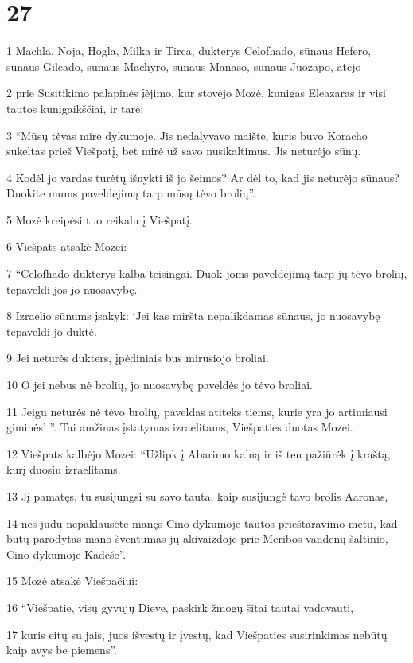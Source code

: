 \chapter{27}

\par 1 Machla, Noja, Hogla, Milka ir Tirca, dukterys Celofhado, sūnaus Hefero, sūnaus Gileado, sūnaus Machyro, sūnaus Manaso, sūnaus Juozapo, atėjo 
\par 2 prie Susitikimo palapinės įėjimo, kur stovėjo Mozė, kunigas Eleazaras ir visi tautos kunigaikščiai, ir tarė: 
\par 3 “Mūsų tėvas mirė dykumoje. Jis nedalyvavo maište, kuris buvo Koracho sukeltas prieš Viešpatį, bet mirė už savo nusikaltimus. Jis neturėjo sūnų. 
\par 4 Kodėl jo vardas turėtų išnykti iš jo šeimos? Ar dėl to, kad jis neturėjo sūnaus? Duokite mums paveldėjimą tarp mūsų tėvo brolių”. 
\par 5 Mozė kreipėsi tuo reikalu į Viešpatį. 
\par 6 Viešpats atsakė Mozei: 
\par 7 “Celofhado dukterys kalba teisingai. Duok joms paveldėjimą tarp jų tėvo brolių, tepaveldi jos jo nuosavybę. 
\par 8 Izraelio sūnums įsakyk: ‘Jei kas miršta nepalikdamas sūnaus, jo nuosavybę tepaveldi jo duktė. 
\par 9 Jei neturės dukters, įpėdiniais bus mirusiojo broliai. 
\par 10 O jei nebus nė brolių, jo nuosavybę paveldės jo tėvo broliai. 
\par 11 Jeigu neturės nė tėvo brolių, paveldas atiteks tiems, kurie yra jo artimiausi giminės’ ”. Tai amžinas įstatymas izraelitams, Viešpaties duotas Mozei. 
\par 12 Viešpats kalbėjo Mozei: “Užlipk į Abarimo kalną ir iš ten pažiūrėk į kraštą, kurį duosiu izraelitams. 
\par 13 Jį pamatęs, tu susijungsi su savo tauta, kaip susijungė tavo brolis Aaronas, 
\par 14 nes judu nepaklausėte manęs Cino dykumoje tautos prieštaravimo metu, kad būtų parodytas mano šventumas jų akivaizdoje prie Meribos vandenų šaltinio, Cino dykumoje Kadeše”. 
\par 15 Mozė atsakė Viešpačiui: 
\par 16 “Viešpatie, visų gyvųjų Dieve, paskirk žmogų šitai tautai vadovauti, 
\par 17 kuris eitų su jais, juos išvestų ir įvestų, kad Viešpaties susirinkimas nebūtų kaip avys be piemens”. 
